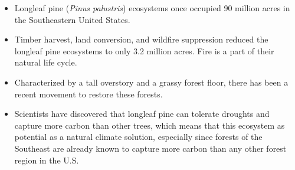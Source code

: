 \documentclass[oneside,a4paper,11pt,explicit]{book}
\begin{document}
\begin{tcolorbox}[colback=yellow!5!white,colframe=IceCreamLeaf,title=\textbf{Today's Study System: Southern Pine Forests}]
\begin{multicols}{2}
	\columnbreak
		\begin{itemize}
			\item Longleaf pine (\textit{Pinus palustris}) ecosystems once occupied 90 million acres in the Southeastern United States.
			\item Timber harvest, land conversion, and wildfire suppression reduced the longleaf pine ecosystems to only 3.2 million acres. Fire is a part of their natural life cycle.
			\item Characterized by a tall overstory and a grassy forest floor, there has been a recent movement to restore these forests.
			\item Scientists have discovered that longleaf pine can tolerate droughts and capture more carbon than other trees, which means that this ecosystem as potential as a natural climate solution, especially since forests of the Southeast are already known to capture more carbon than any other forest region in the U.S.
		\end{itemize}
	\end{multicols}
\end{tcolorbox}
\end{document}
